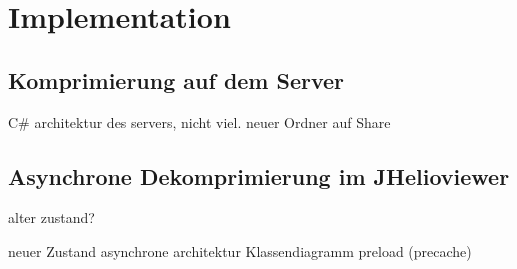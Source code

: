 \section{Implementation}

\subsection{Komprimierung auf dem Server}
C\# architektur des servers, nicht viel.
neuer Ordner auf Share


\subsection{Asynchrone Dekomprimierung im JHelioviewer}
alter zustand?

neuer Zustand
asynchrone architektur
Klassendiagramm
preload
(precache)

